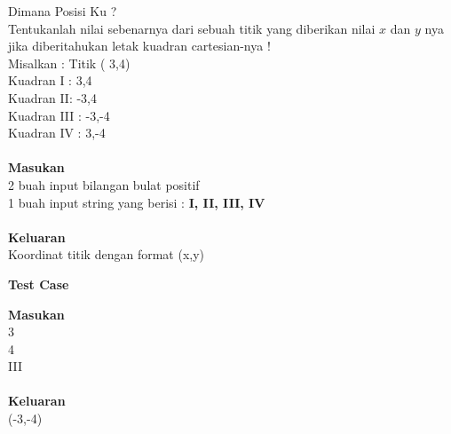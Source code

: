 \begin{permasalahan}{Dimana Posisi Ku ?}\\
\label{prob:dimanaPosisiKu}
Tentukanlah nilai sebenarnya dari sebuah titik yang diberikan nilai $x$ dan $y
$ nya jika diberitahukan letak kuadran cartesian-nya ! \\
Misalkan : Titik ( 3,4) \\
Kuadran I : 3,4 \\
Kuadran II: -3,4 \\
Kuadran III : -3,-4 \\
Kuadran IV : 3,-4 \\\\
	\textbf{Masukan}\\
	2 buah input bilangan bulat positif \\
	1 buah input string yang berisi : \textbf{I, II, III, IV}\\\\
	\textbf{Keluaran}\\
	Koordinat titik dengan format (x,y) \\
	\begin{center}
	\textbf{Test Case}\\
	\end{center}
	\textbf{Masukan}\\
	3 \\
	4 \\
	III \\\\
	\textbf{Keluaran}\\
	(-3,-4)
\end{permasalahan}

